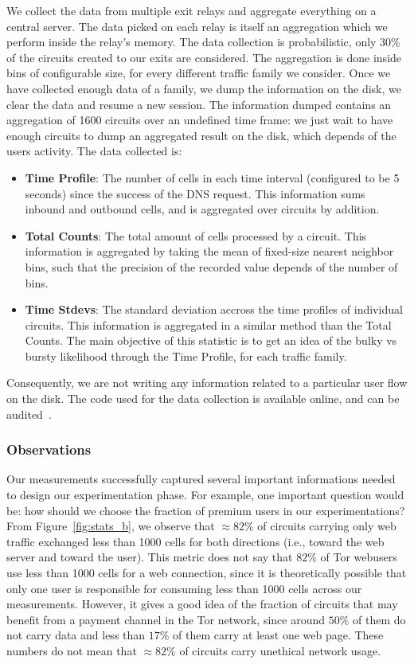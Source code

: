 We collect the data from multiple exit relays and aggregate everything on a central server. The data picked on each relay is itself an aggregation which we perform inside the relay's memory. The data collection is probabilistic, only 30\% of the circuits created to our exits are considered. The aggregation is done inside bins of configurable size, for every different traffic family we consider. Once we have collected enough data of a family, we dump the information on the disk, we clear the data and resume a new session. The information dumped contains an aggregation of 1600 circuits over an undefined time frame: we just wait to have enough circuits to dump an aggregated result on the disk, which depends of the users activity. The data collected is:
\begin{itemize}
	\item \textbf{Time Profile}: The number of cells in each time interval (configured to be 5 seconds) since the success of the DNS request. This information sums inbound and outbound cells, and is aggregated over circuits by addition.
	\item \textbf{Total Counts}: The total amount of cells processed by a circuit. This information is aggregated by taking the mean of fixed-size nearest neighbor bins, such that the precision of the recorded value depends of the number of bins.
	\item \textbf{Time Stdevs}: The standard deviation accross the time profiles of individual circuits. This information is aggregated in a similar method than the Total Counts. The main objective of this statistic is to get an idea of the bulky vs bursty likelihood through the Time Profile, for each traffic family.
\end{itemize}
Consequently, we are not writing any information related to a particular user flow on the disk. The code used for the data collection is available online, and can be audited~\cite{code-mt_stats}.

\subsubsection{Observations}

Our measurements successfully captured several important informations needed to design our experimentation phase. For example, one important question would be: how should we choose the fraction of premium users in our experimentations? From Figure~\ref{fig:stats_b}, we observe that $\approx 82\%$ of circuits carrying only web traffic exchanged less than 1000 cells for both directions (i.e., toward the web server and toward the user). This metric does not say that $82\%$ of Tor webusers use less than 1000 cells for a web connection, since it is theoretically possible that only one user is responsible for consuming less than 1000 cells across our measurements. However, it gives a good idea of the fraction of circuits that may benefit from a payment channel in the Tor network, since around $50\%$ of them do not carry data and less than $17\%$ of them carry at least one web page. These numbers do not mean that $\approx 82\%$ of circuits carry unethical network usage.

